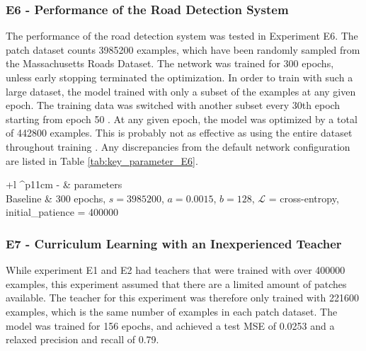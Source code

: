 \subsubsection{E6 - Performance of the Road Detection System}
The performance of the road detection system was tested in Experiment E6. The patch dataset counts 3985200 examples, which have been randomly sampled from the Massachusetts Roads Dataset. The network was trained for 300 epochs, unless early stopping terminated the optimization. In order to train with such a large dataset, the model trained with only a subset of the examples at any given epoch. The training data was switched with another subset every 30th epoch starting from epoch 50 . At any given epoch, the model was optimized by a total of 442800 examples. This is probably not as effective as using the entire dataset throughout training . Any discrepancies from the default network configuration are listed in Table \ref{tab:key_parameter_E6}.
\begin{table}[h]
\caption[Parameters for Experiment E6]{Key parameters for Experiment E6.}
\begin{center}
\begin{adjustbox}{max width=\textwidth}
\begin{tabular}{+l ^p{11cm}}\hline
\rowstyle{\bfseries}
  - & parameters \\\hline
  Baseline & 300 epochs, $s=3 985 200$, $a=0.0015$, $b=128$, $\mathcal{L}$ = cross-entropy, initial\_patience = 400000  \\
  \hline
\end{tabular}
\end{adjustbox}
\end{center}
\label{tab:key_parameter_E6}
\end{table}

\subsubsection{E7 - Curriculum Learning with an Inexperienced Teacher}
While experiment E1 and E2 had teachers that were trained with over 400000 examples, this  
experiment assumed that there are a limited amount of patches available. The teacher for this experiment was therefore only trained with 221600 examples, which is the same number of examples in each patch dataset. The model was trained for 156 epochs, and achieved a test \ac{MSE} of 0.0253 and a relaxed precision and recall of 0.79.\\

